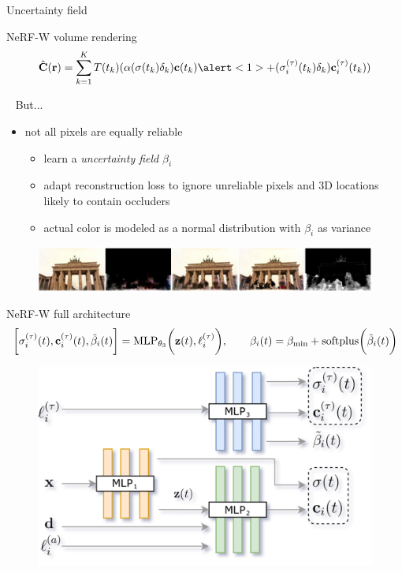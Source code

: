 \documentclass[aspectratio=1610]{beamer}
\newcommand{\parenth}[2][]{#1(#2#1)}
\begin{document}
\begin{frame}{Uncertainty field}
    \begin{block}{NeRF-W volume rendering}
        \begin{equation*}
            \hat{\vb{C}}(\vb{r}) = \sum_{k = 1}^{K} T(t_k) ( \alpha (\sigma (t_k)\delta_k)  \vb{c}(t_k)  \alert<1>{+ (\sigma_i^{(\tau)} (t_k)\delta_k)  \vb{c}_i^{(\tau)}(t_k)})
        \end{equation*}
    \end{block}\
    \bigskip
    But... 
    \pause
    \begin{itemize}
        \item not all pixels are equally reliable
        \begin{itemize}
            \item learn a \emph{uncertainty field} \(\beta_i\)
            \item adapt reconstruction loss to ignore unreliable pixels and 3D locations likely to contain occluders
            \item actual color is modeled as a normal distribution with \(\beta_i\) as variance
        \end{itemize}
    \end{itemize}
    \bigskip
    \pause
    \begin{figure}[H]
        \centering
        \includegraphics[width=.75\textwidth]{render.png}
    \end{figure}
\end{frame}

\begin{frame}{NeRF-W full architecture}
    \begin{equation*}
        \bigg[\sigma_i^{(\tau)} (t), \vb{c}_i^{(\tau)} (t), \tilde{\beta}_i (t)\bigg] = \textrm{MLP}_{\theta_3} \parenth[\bigg]{\vb{z}(t), \ell_i^{(\tau)}},
        \quad\quad 
        \beta_i (t) = \beta_{\textrm{min}} + \textrm{softplus}\parenth[\bigg]{\tilde{\beta}_i (t)}
    \end{equation*}
    \begin{figure}[H]
        \centering
        \includegraphics[width=.65\textwidth,keepaspectratio]{nerfw-architecture.png}
    \end{figure}
\end{frame}
\end{document}

